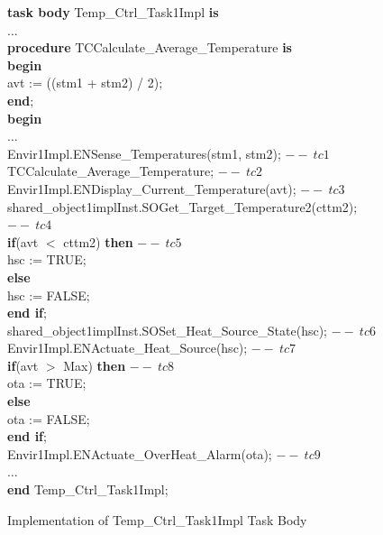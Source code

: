 \begin{figure}
\begin{sffamily}
\begin{center}
\begin{minipage}{\linewidth}
\begin{tabbing}
\textbf{task body} Temp\_Ctrl\_Task1Impl \textbf{is} \qquad\qquad\qquad\qquad\qquad\qquad\qquad \= \\
\quad$\ldots$  \\
\quad\textbf{procedure} TCCalculate\_Average\_Temperature \textbf{is} \\
\quad\textbf{begin} \\
\qquad avt := ((stm1 + stm2) / 2); \\
\quad\textbf{end}; \\
\quad\textbf{begin} \\
\quad$\ldots$ \\
\quad   Envir1Impl.ENSense\_Temperatures(stm1, stm2); \>$--~tc1$\\
\quad    TCCalculate\_Average\_Temperature; \>$--~tc2$ \\
\quad    Envir1Impl.ENDisplay\_Current\_Temperature(avt); \>$--~tc3$ \\
\quad    shared\_object1implInst.SOGet\_Target\_Temperature2(cttm2); \>$--~tc4$ \\
\quad    \textbf{if}(avt $<$ cttm2) \textbf{then} \>$--~tc5$ \\
\qquad        hsc := TRUE;\\
\quad    \textbf{else} \\
\qquad        hsc := FALSE; \\
\quad    \textbf{end if}; \\
\quad    shared\_object1implInst.SOSet\_Heat\_Source\_State(hsc); \>$--~tc6$  \\
\quad    Envir1Impl.ENActuate\_Heat\_Source(hsc); \>$--~tc7$\\
\quad    \textbf{if}(avt $>$ Max) \textbf{then} \>$--~tc8$ \\
\qquad        ota := TRUE; \\
\quad   \textbf{else} \\
\qquad        ota := FALSE; \\
\quad    \textbf{end if}; \\
\quad    Envir1Impl.ENActuate\_OverHeat\_Alarm(ota); \>$--~tc9$ \\
\quad$\ldots$ \\
\textbf{end} Temp\_Ctrl\_Task1Impl; 
\end{tabbing}
\end{minipage}
\end{center}
\end{sffamily}
	\caption{Implementation of Temp\_Ctrl\_Task1Impl Task Body}
	\label{fig:tempTask}
\end{figure}

